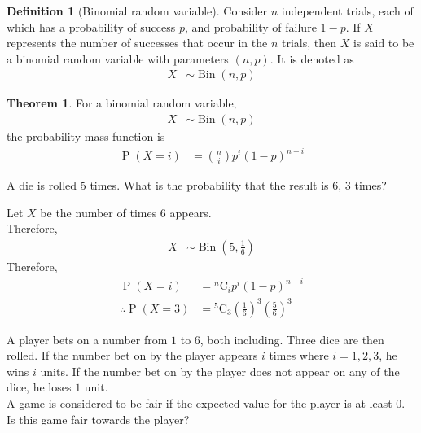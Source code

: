 \documentclass[titlepage, fleqn, a4paper, 12pt, twoside]{article}
\theoremstyle{definition}
\newtheorem{definition}{Definition}
\theoremstyle{theorem}
\newtheorem{theorem}{Theorem}
\DeclareMathOperator{\prob}{\mathrm{P}}
\DeclareMathOperator{\bin}{\mathrm{Bin}}
\newcommand*{\comb}[2]{{}^{#1}\mathrm{C}_{#2}}%
\begin{document}
\begin{definition}[Binomial random variable]
	Consider $n$ independent trials, each of which has a probability of success $p$, and probability of failure $1 - p$.
	If $X$ represents the number of successes that occur in the $n$ trials, then $X$ is said to be a binomial random variable with parameters $(n,p)$.
	It is denoted as
	\begin{align*}
		X & \sim \bin(n,p)
	\end{align*}
\end{definition}

\begin{theorem}
	For a binomial random variable,
	\begin{align*}
		X & \sim \bin(n,p)
	\end{align*}
	the probability mass function is
	\begin{align*}
		\prob(X = i) & = \binom{n}{i} p^i (1 - p)^{n - i}
	\end{align*}
\end{theorem}

\begin{question}
	A die is rolled $5$ times.
	What is the probability that the result is $6$, $3$ times?
\end{question}

\begin{solution}
	Let $X$ be the number of times $6$ appears.\\
	Therefore,
	\begin{align*}
		X &\sim \bin\left( 5,\frac{1}{6} \right)
	\end{align*}
	Therefore,
	\begin{align*}
		\prob(X = i)            & = \comb{n}{i} p^i (1 - p)^{n - i} \\
		\therefore \prob(X = 3) & = \comb{5}{3} \left( \frac{1}{6} \right)^3 \left( \frac{5}{6} \right)^3
	\end{align*}
\end{solution}

\begin{question}
	A player bets on a number from $1$ to $6$, both including.
	Three dice are then rolled.
	If the number bet on by the player appears $i$ times where $i = 1,2,3$, he wins $i$ units.
	If the number bet on by the player does not appear on any of the dice, he loses $1$ unit.\\
	A game is considered to be fair if the expected value for the player is at least $0$.
	Is this game fair towards the player?
\end{question}
\end{document}
